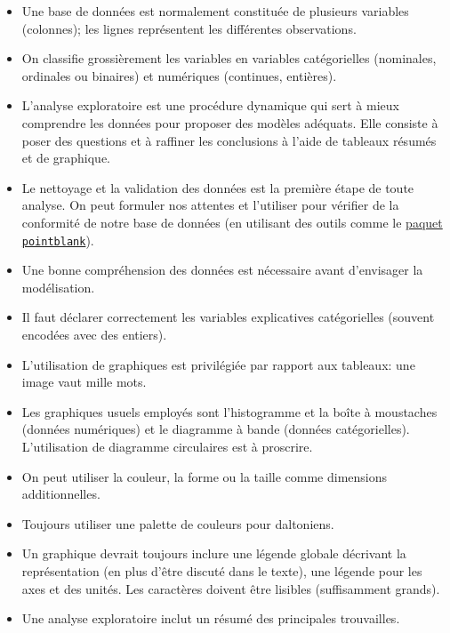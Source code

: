 \documentclass[
  11pt,
  letterpaper,
]{scrbook}
\providecommand{\tightlist}{%
  \setlength{\itemsep}{0pt}\setlength{\parskip}{0pt}}\usepackage{longtable,booktabs,array}
\theoremstyle{definition}
\theoremstyle{remark}
\begin{document}
\begin{tcolorbox}
\begin{itemize}
\tightlist
\item
  Une base de données est normalement constituée de plusieurs variables
  (colonnes); les lignes représentent les différentes observations.
\item
  On classifie grossièrement les variables en variables catégorielles
  (nominales, ordinales ou binaires) et numériques (continues,
  entières).
\item
  L'analyse exploratoire est une procédure dynamique qui sert à mieux
  comprendre les données pour proposer des modèles adéquats. Elle
  consiste à poser des questions et à raffiner les conclusions à l'aide
  de tableaux résumés et de graphique.
\item
  Le nettoyage et la validation des données est la première étape de
  toute analyse. On peut formuler nos attentes et l'utiliser pour
  vérifier de la conformité de notre base de données (en utilisant des
  outils comme le
  \href{https://github.com/rich-iannone/pointblank}{paquet
  \texttt{pointblank}}).
\item
  Une bonne compréhension des données est nécessaire avant d'envisager
  la modélisation.
\item
  Il faut déclarer correctement les variables explicatives catégorielles
  (souvent encodées avec des entiers).
\item
  L'utilisation de graphiques est privilégiée par rapport aux tableaux:
  une image vaut mille mots.
\item
  Les graphiques usuels employés sont l'histogramme et la boîte à
  moustaches (données numériques) et le diagramme à bande (données
  catégorielles). L'utilisation de diagramme circulaires est à
  proscrire.
\item
  On peut utiliser la couleur, la forme ou la taille comme dimensions
  additionnelles.
\item
  Toujours utiliser une palette de couleurs pour daltoniens.
\item
  Un graphique devrait toujours inclure une légende globale décrivant la
  représentation (en plus d'être discuté dans le texte), une légende
  pour les axes et des unités. Les caractères doivent être lisibles
  (suffisamment grands).
\item
  Une analyse exploratoire inclut un résumé des principales trouvailles.
\end{itemize}

\end{tcolorbox}
\end{document}
